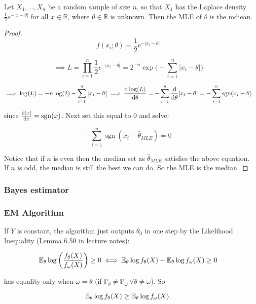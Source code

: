 \begin{proposition}
Let $X_{1},\ldots,X_{n}$ be a random sample of size $n$, so that $X_{1}$ has the Laplace density $\frac{1}{2}e^{-|x-\theta|}$ for all $x\in\mathbb{R}$, where $\theta\in\mathbb{R}$ is unknown. Then the MLE of $\theta$ is the mdiean.
\end{proposition}

\begin{proof}

\[
f(x_i; \theta) = \frac{1}{2}e^{-|x_i-\theta|}
\]

\[
\implies L = \prod_{i=1}^n  \frac{1}{2}e^{-|x_i-\theta|} = 2^{-n}  \exp \bigg(- \sum_{i=1}^n  |x_i-\theta|\bigg)
\]

\[
\implies \log(L) = -n \log (2) - \sum_{i=1}^n  |x_i-\theta|  \implies  \deriv{\log(L)}{\theta} = - \sum_{i=1}^n  \deriv{}{\theta} |x_i-\theta| = - \sum_{i=1}^n \operatorname{sgn} (x_i-\theta)
\]

since  \(\deriv{|x|}{x} =  \operatorname{sgn}(x)\). Next set this equal to 0 and solve:

\[
 - \sum_{i=1}^n \operatorname{sgn} (x_i-\hat{\theta}_{MLE}) = 0 
 \]
 
Notice that if \(n\) is even then the median set as \(\hat{\theta}_{MLE}\) satisfies the above equation. If \(n\) is odd, the median is still the best we can do. So the MLE is the median.

%
%
%


\end{proof}

\subsubsection{Bayes estimator}

\subsubsection{EM Algorithm}

\begin{remark}If \(Y\) is constant, the algorithm just outputs \(\theta_0\) in one step by the Likelihood Inequality (Lemma 6.50 in lecture notes):

\[
\E_\theta  \log \left( \frac{f_\theta(X) }{f_{\omega}(X) }  \right) \geq 0 \iff \E_\theta \log f_\theta(X) - \E_\theta \log f_\omega(X) \geq 0
\]

has equality only when \(\omega = \theta\) (if \(\mathbb{P}_\theta \neq \mathbb{P}_\omega \ \forall \theta \neq \omega\)). So

\[
\E_\theta \log f_\theta(X) \geq \E_\theta \log f_\omega(X).
\]

\end{remark}

